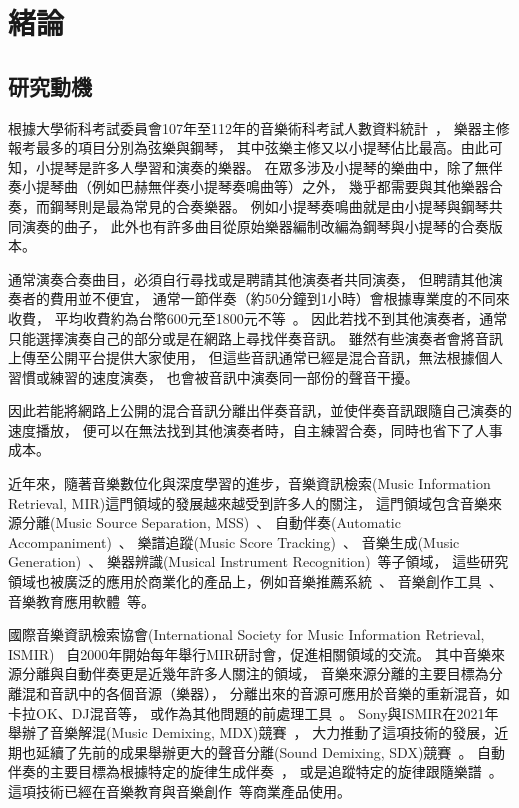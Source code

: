 \documentclass[class=NCU_thesis, crop=false]{standalone}
\begin{document}
\chapter{緒論}
\section{研究動機}

根據大學術科考試委員會107年至112年的音樂術科考試人數資料統計~\cite{CAPE2024Statistics}，
樂器主修報考最多的項目分別為弦樂與鋼琴，
其中弦樂主修又以小提琴佔比最高。由此可知，小提琴是許多人學習和演奏的樂器。
在眾多涉及小提琴的樂曲中，除了無伴奏小提琴曲（例如巴赫無伴奏小提琴奏鳴曲等）之外，
幾乎都需要與其他樂器合奏，而鋼琴則是最為常見的合奏樂器。
例如小提琴奏鳴曲就是由小提琴與鋼琴共同演奏的曲子，
此外也有許多曲目從原始樂器編制改編為鋼琴與小提琴的合奏版本。

通常演奏合奏曲目，必須自行尋找或是聘請其他演奏者共同演奏，
但聘請其他演奏者的費用並不便宜，
通常一節伴奏（約50分鐘到1小時）會根據專業度的不同來收費，
平均收費約為台幣600元至1800元不等~\cite{2020PianoAccompanistHourlySalary}。
因此若找不到其他演奏者，通常只能選擇演奏自己的部分或是在網路上尋找伴奏音訊。
雖然有些演奏者會將音訊上傳至公開平台提供大家使用，
但這些音訊通常已經是混合音訊，無法根據個人習慣或練習的速度演奏，
也會被音訊中演奏同一部份的聲音干擾。

因此若能將網路上公開的混合音訊分離出伴奏音訊，並使伴奏音訊跟隨自己演奏的速度播放，
便可以在無法找到其他演奏者時，自主練習合奏，同時也省下了人事成本。

近年來，隨著音樂數位化與深度學習的進步，音樂資訊檢索(Music Information Retrieval, MIR)這門領域的發展越來越受到許多人的關注，
這門領域包含音樂來源分離(Music Source Separation, MSS)~\cite{défossez2021music, Cano2019Musical, Rafii2018Overview}、
自動伴奏(Automatic Accompaniment)~\cite{davies2007towards, li2020application, zhang2023design}、
樂譜追蹤(Music Score Tracking)~\cite{orio2003score, dorfer2016towards}、
音樂生成(Music Generation)~\cite{ji2020comprehensive, hernandez2022music}、
樂器辨識(Musical Instrument Recognition)~\cite{solanki2022music, racharla2020predominant, manilow2020hierarchical}等子領域，
這些研究領域也被廣泛的應用於商業化的產品上，例如音樂推薦系統~\cite{Mangla2023Spotify}、
音樂創作工具~\cite{Ableton2024Ableton11, Apple2024LogicPro, PreSonus2024StudioOne}、
音樂教育應用軟體~\cite{Ronimusic2024Amazing, FORSCORE2024forScore}等。

國際音樂資訊檢索協會(International Society for Music Information Retrieval, ISMIR)~\cite{ISMIR2024InternationalSociety}
自2000年開始每年舉行MIR研討會，促進相關領域的交流。
其中音樂來源分離與自動伴奏更是近幾年許多人關注的領域，
音樂來源分離的主要目標為分離混和音訊中的各個音源（樂器），
分離出來的音源可應用於音樂的重新混音，如卡拉OK、DJ混音等，
或作為其他問題的前處理工具~\cite{zhao2022research}。
Sony與ISMIR在2021年舉辦了音樂解混(Music Demixing, MDX)競賽~\cite{Yuki_Mitsufuji2021MusicDemixing}，
大力推動了這項技術的發展，近期也延續了先前的成果舉辦更大的聲音分離(Sound Demixing, SDX)競賽~\cite{Fabbro_Giorgio2023TheSoundDemixing}。
自動伴奏的主要目標為根據特定的旋律生成伴奏~\cite{wang2022songdriver, ding2023museflow}，
或是追蹤特定的旋律跟隨樂譜~\cite{brazier2021improving}。
這項技術已經在音樂教育與音樂創作~\cite{Antescofo2024metronautapp}等商業產品使用。
\end{document}

